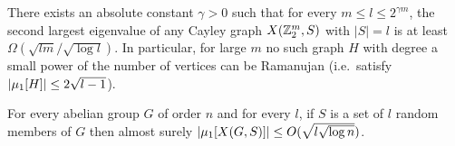 \begin{proposition}
  \label{prop:prop7}
  \notready
  There exists an absolute constant $\gamma > 0$ such that for every
  $m \le l \le 2^{\gamma m}$, the second largest eigenvalue of any Cayley graph
  $X(\mathbb{Z}_2^{m}, S)$ with $|S| = l$ is at least
  $\Omega(\sqrt{lm}/\sqrt{\log l})$. In particular, for large $m$ no such graph
  $H$ with degree a small power of the number of vertices can be Ramanujan
  (i.e.\ satisfy $|\mu_{1}[H]| \le 2\sqrt{l-1}$).
\end{proposition}

\begin{proposition}
  \label{prop:prop6prime}
  \notready
  For every abelian group $G$ of order $n$ and for every $l$, if $S$ is a set of
  $l$ random members of $G$ then almost surely
  $|\mu_{1}[X(G,S)]| \le O(\sqrt{l\sqrt{\log n}})$.
\end{proposition}


